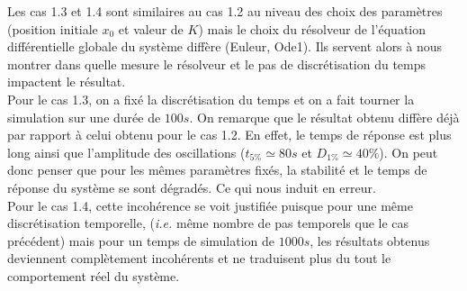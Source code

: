 \documentclass[a4paper]{article}
\begin{document}
                        Les cas 1.3 et 1.4 sont similaires au cas 1.2 au niveau des choix des paramètres (position initiale $x_0$ et valeur de $K$)
                        mais le choix du résolveur de l'équation différentielle globale du système diffère (Euleur, Ode1).
                        Ils servent alors à nous montrer dans quelle mesure le résolveur et le pas de discrétisation du temps impactent le résultat. \\

                        Pour le cas 1.3, on a fixé la discrétisation du temps et on a fait tourner la simulation sur une durée de $100s$.
                        On remarque que le résultat obtenu diffère déjà par rapport à celui obtenu pour le cas 1.2.
                        En effet, le temps de réponse est plus long ainsi que l'amplitude des oscillations ($t_{5\%} \simeq 80s$ et $D_{1\%} \simeq 40\%$).
                        On peut donc penser que pour les mêmes paramètres fixés, la stabilité et le temps de réponse du système se sont dégradés.
                        Ce qui nous induit en erreur. \\
                        
                        Pour le cas 1.4, cette incohérence se voit justifiée puisque pour une même discrétisation temporelle, 
                        (\textit{i.e.} même nombre de pas temporels que le cas précédent) mais pour un temps de simulation de $1000s$,
                        les résultats obtenus deviennent complètement incohérents et ne traduisent plus du tout le comportement réel du système.
\end{document}
